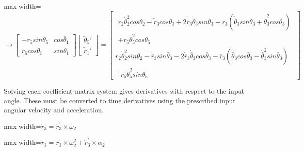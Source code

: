 \documentclass[11pt,a4paper]{article}
\begin{document}
\begin{center}\begin{adjustbox}{max width=\linewidth}$\displaystyle \rightarrow \left[ \begin{matrix}-{r}_{5}sin{\theta }_{5} & cos{\bar{\theta }}_{1}\\{r}_{5}cos{\theta }_{5} & sin{\bar{\theta }}_{1}\end{matrix}\right]\left[ \begin{gathered}{\ddot{\theta }}_{5}'\\{\ddot{\bar{r}}}_{1}'\end{gathered}\right]=\left[ \begin{gathered}\begin{gathered}{r}_{2}{\dot{\theta }}_{2}^{2}cos{\theta }_{2}-{\ddot{\bar{r}}}_{3}cos{\bar{\theta }}_{3}+2{\dot{\bar{r}}}_{3}{\dot{\bar{\theta }}}_{3}sin{\bar{\theta }}_{3}+{\bar{r}}_{3}\left( {\ddot{\bar{\theta }}}_{3}sin{\bar{\theta }}_{3}+{\dot{\bar{\theta }}}_{3}^{2}cos{\bar{\theta }}_{3}\right)\\+{r}_{5}{\dot{\theta }}_{5}^{2}cos{\theta }_{5}\end{gathered}\\{r}_{2}{\dot{\theta }}_{2}^{2}sin{\theta }_{2}-{\ddot{\bar{r}}}_{3}sin{\bar{\theta }}_{3}-2{\dot{\bar{r}}}_{3}{\dot{\bar{\theta }}}_{3}cos{\bar{\theta }}_{3}-{\bar{r}}_{3}\left( {\ddot{\bar{\theta }}}_{3}cos{\bar{\theta }}_{3}-{\dot{\bar{\theta }}}_{3}^{2}sin{\bar{\theta }}_{3}\right)\\+{r}_{5}{\dot{\theta }}_{5}^{2}sin{\theta }_{5}\end{gathered}\right]$\end{adjustbox}\end{center}

Solving each coefficient-matrix system gives derivatives with respect to the input angle. These must be converted to time derivatives using the prescribed input angular velocity and acceleration.

\begin{center}\begin{adjustbox}{max width=\linewidth}$\displaystyle {\dot{r}}_{3}={\dot{r}}_{3}^{'}\times {\omega }_{2}$\end{adjustbox}\end{center}

\begin{center}\begin{adjustbox}{max width=\linewidth}$\displaystyle {\ddot{r}}_{3}={\ddot{r}}_{3}^{'}\times {\omega }_{2}^{2}+{\dot{r}}_{3}^{'}\times {\alpha }_{2}$\end{adjustbox}\end{center}
\end{document}
